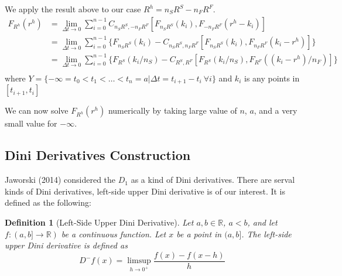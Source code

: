 \documentclass[11pt, leqno]{article}
\newtheorem{definition}{Definition}[section]
\numberwithin{equation}{section}
\begin{document}
We apply the result above to our case $R^h = n_S R^S - n_F R^F$.
\begin{align*}
    F_{R^h}(r^h)
                &= \lim_{\Delta t \rightarrow 0}
                   \sum^{n-1}_{i=0} C_{n_S R^S, -n_F R^F}[F_{n_S R^S}(k_i), F_{-n_F R^F}(r^h-k_i)] \nonumber \\
                &= \lim_{\Delta t \rightarrow 0}
                   \sum^{n-1}_{i=0} \{F_{n_S R^S}(k_i) - C_{n_S R^S, n_F R^F}[F_{n_S R^S}(k_i), F_{n_F R^F}(k_i-r^h)]\}\\
                &= \lim_{\Delta t \rightarrow 0}
                       \sum^{n-1}_{i=0} \{F_{R^S}(k_i/n_S) - C_{R^S, R^F}[F_{R^S}(k_i/n_S), F_{R^F}((k_i-r^h)/n_F)]\}\\
\end{align*}
        where $Y = \{-\infty= t_0 < t_1<\dots<t_n=a| \Delta t = t_{i+1}-t_i~\forall i\}$ and $k_i$ is any points in $[t_{i+1},t_i]$ \newline

We can now solve $F_{R^h}(r^h)$ numerically by taking large value of $n$, $a$, and a very small value for $-\infty$.
\subsection{Dini Derivatives Construction}\label{sec:Dini}


Jaworski (2014) considered the $D_1$ as a kind of Dini derivatives.
There are serval kinds of Dini derivatives, left-side upper Dini derivative is of our interest. It is defined as the following:

\theoremstyle{definition}
\begin{definition}[Left-Side Upper Dini Derivative]
    Let $a,b \in \mathbb{R}$, $a < b$, and let $f:(a,b] \rightarrow \mathbb{R})$ be a continuous function.
    Let $x$ be a point in $(a,b]$.
    The left-side upper Dini derivative is defined as
    \[D^- f(x) = \limsup_{h \rightarrow 0^+} \frac{f(x)-f(x-h)}{h}\]
\end{definition}
\end{document}
